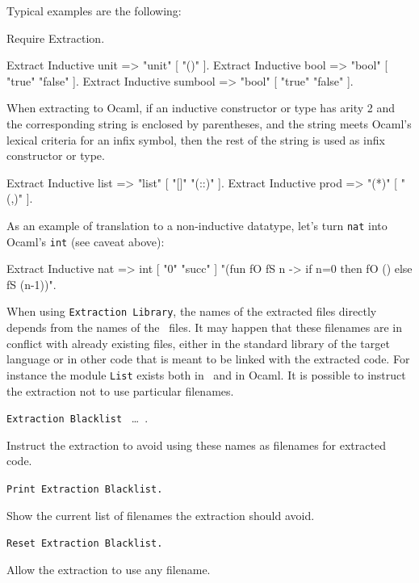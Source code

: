 \Example
Typical examples are the following:
\begin{coq_eval}
Require Extraction.
\end{coq_eval}
\begin{coq_example}
Extract Inductive unit => "unit" [ "()" ].
Extract Inductive bool => "bool" [ "true" "false" ].
Extract Inductive sumbool => "bool" [ "true" "false" ].
\end{coq_example}

\noindent When extracting to Ocaml, if an inductive constructor or type
has arity 2 and the corresponding string is enclosed by parentheses,
and the string meets Ocaml's lexical criteria for an infix symbol,
then the rest of the string is used as infix constructor or type.

\begin{coq_example}
Extract Inductive list => "list" [ "[]" "(::)" ].
Extract Inductive prod => "(*)"  [ "(,)" ].
\end{coq_example}

\noindent As an example of translation to a non-inductive datatype, let's turn
{\tt nat} into Ocaml's {\tt int} (see caveat above):
\begin{coq_example}
Extract Inductive nat => int [ "0" "succ" ]
 "(fun fO fS n -> if n=0 then fO () else fS (n-1))".
\end{coq_example}



When using {\tt Extraction Library}, the names of the extracted files
directly depends from the names of the \Coq\ files. It may happen that
these filenames are in conflict with already existing files, 
either in the standard library of the target language or in other
code that is meant to be linked with the extracted code. 
For instance the module {\tt List} exists both in \Coq\ and in Ocaml.
It is possible to instruct the extraction not to use particular filenames.

\begin{description}
\item{\tt Extraction Blacklist} \ident\ \dots\ \ident. ~\par
  Instruct the extraction to avoid using these names as filenames
  for extracted code. 
\item{\tt Print Extraction Blacklist.} ~\par
  Show the current list of filenames the extraction should avoid.
\item{\tt Reset Extraction Blacklist.} ~\par
  Allow the extraction to use any filename.
\end{description}

